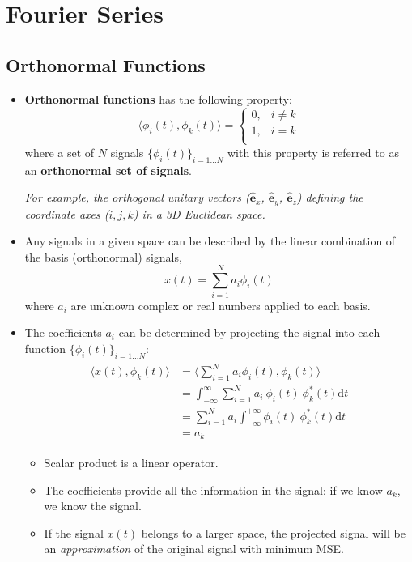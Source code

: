 \section{Fourier Series}
\subsection{Orthonormal Functions}
\begin{itemize}
    \item \textbf{Orthonormal functions} has the following property:
    \[ 
        \langle \phi_{i}(t), \phi_{k}(t) \rangle = 
        \begin{cases}
        0, & i \neq k\\
        1, & i = k\\
        \end{cases} 
    \]
    where a set of $N$ signals $\{ \phi_{i}(t) \}_{i=1...N}$ with this property is referred to as an \textbf{orthonormal set of signals}.
    
    \textit{For example, the orthogonal unitary vectors ($\hat{\mathbf{e}}_x$, $\hat{\mathbf{e}}_y$, $\hat{\mathbf{e}}_z$) defining the coordinate axes ($i,j,k$) in a 3D Euclidean space.}

    \item Any signals in a given space can be described by the linear combination of the basis (orthonormal) signals,
    \[ x(t) = \sum_{i=1}^{N} a_{i} \phi_{i}(t) \]
    where $a_{i}$ are unknown complex or real numbers applied to each basis.
    
    \item The coefficients $a_{i}$ can be determined by projecting the signal into each function $\{ \phi_{i}(t)\}_{i=1...N} $:
    \begin{align*}
    \begin{split}
    \langle x(t), \phi_{k}(t) \rangle
    &= \langle \sum_{i=1}^{N} a_{i} \phi_{i}(t), \phi_{k}(t) \rangle \\
    &= \int_{-\infty}^{\infty} \sum_{i=1}^{N} a_{i} \ \phi_{i}(t) \ \phi_{k}^{*}(t) \mathrm{d}t\\
    &= \sum_{i=1}^{N} a_{i} \int_{-\infty}^{+\infty}\phi_{i}(t) \ \phi_{k}^{*}(t) \mathrm{d}t \\
    &= a_{k}
    \end{split} \end{align*}

    \begin{itemize}
        \item Scalar product is a linear operator.
        \item The coefficients provide all the information in the signal: if we know $a_{k}$, we know the signal.
        \item If the signal $x(t)$ belongs to a larger space, the projected signal will be an \textit{approximation} of the original signal with minimum MSE.
        \end{itemize} 
\end{itemize}

